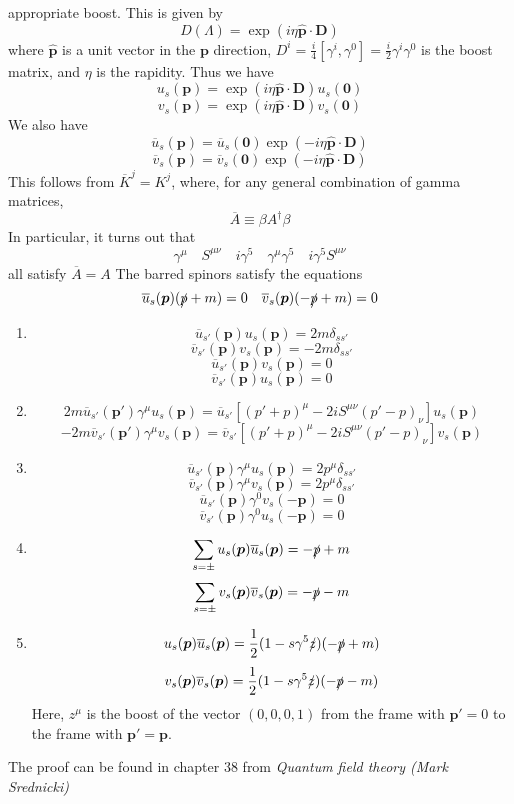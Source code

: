appropriate boost. This is given by
\[D(\Lambda) = \exp(i\eta \hat{\bm{p}} \cdot \bm{D})\]
where $\hat{\bm{p}}$ is a unit vector in the $\bm{p}$ direction, $D^i = \frac{i}{4}[\gamma^i,\gamma^0] = \frac{i}{2} \gamma^i \gamma^0$ is the boost matrix, and $\eta$ is the rapidity. Thus we have
\[u_s(\bm{p}) = \exp(i\eta \hat{\bm{p}} \cdot \bm{D}) u_s(\bm{0})\]
\[v_s(\bm{p}) = \exp(i\eta \hat{\bm{p}} \cdot \bm{D}) v_s(\bm{0})\]
We also have
\[\overline{u}_s(\bm{p}) = \overline{u}_s(\bm{0}) \exp(-i\eta \hat{\bm{p}} \cdot \bm{D}) \]
\[\overline{v}_s(\bm{p}) = \overline{v}_s(\bm{0}) \exp(-i\eta \hat{\bm{p}} \cdot \bm{D}) \]
This follows from $\overline{K}^j = K^j$, where, for any general combination of gamma matrices,
\[\overline{A} \equiv \beta A^{\dagger} \beta\]
In particular, it turns out that
\[\gamma^{\mu} \quad S^{\mu \nu} \quad i\gamma^5  \quad \gamma^{\mu}\gamma^5 \quad i\gamma^5 S^{\mu \nu}\]
all satisfy $\overline{A} = A$
The barred spinors satisfy the equations
\[\overline{u}_s(\bm{p})(\slashed{p}+m)=0 \quad \overline{v}_s(\bm{p})(-\slashed{p}+m)=0\]
\begin{newprop}
\begin{enumerate}
\item \[\overline{u}_{s'}(\bm{p}) u_s(\bm{p}) = 2m\delta_{ss'}\]
\[\overline{v}_{s'}(\bm{p}) v_s(\bm{p}) = -2m\delta_{ss'}\]
\[\overline{u}_{s'}(\bm{p}) v_s(\bm{p}) = 0\]
\[\overline{v}_{s'}(\bm{p}) u_s(\bm{p}) = 0\]
\item 
\[2m \overline{u}_{s'}(\bm{p}') \gamma^{\mu} u_s(\bm{p}) =  \overline{u}_{s'} [(p'+p)^{\mu} -2i S^{\mu \nu}(p'-p)_{\nu}]u_s(\bm{p})\]
\[-2m \overline{v}_{s'}(\bm{p}') \gamma^{\mu} v_s(\bm{p}) =  \overline{v}_{s'} [(p'+p)^{\mu} -2i S^{\mu \nu}(p'-p)_{\nu}]v_s(\bm{p})\]
\item   \[\overline{u}_{s'}(\bm{p}) \gamma^{\mu} u_s(\bm{p}) = 2p^{\mu} \delta_{ss'}\]
\[\overline{v}_{s'}(\bm{p}) \gamma^{\mu} v_s(\bm{p}) = 2p^{\mu} \delta_{ss'}\]
\[\overline{u}_{s'}(\bm{p}) \gamma^{0} v_s(-\bm{p}) = 0\]
\[\overline{v}_{s'}(\bm{p}) \gamma^{0} u_s(-\bm{p}) = 0\]
\item \[\sum_{s=\pm} u_s(\bm{p}) \overline{u}_s(\bm{p}) = - \slashed{p}+m \]
\[\sum_{s=\pm} v_s(\bm{p}) \overline{v}_s(\bm{p}) = - \slashed{p}-m \]
\item \[u_s(\bm{p}) \overline{u}_s(\bm{p}) =\frac{1}{2}(1-s\gamma^5\slashed{z})(-\slashed{p}+m)\]
 \[v_s(\bm{p}) \overline{v}_s(\bm{p}) =\frac{1}{2}(1-s\gamma^5\slashed{z})(-\slashed{p}-m)\]
Here, $z^{\mu}$ is the boost of the vector $(0,0,0,1)$ from the frame with $\bm{p}'=0$ to the frame with $\bm{p}'=\bm{p}$.  
\end{enumerate}
The proof can be found in chapter 38 from \emph{Quantum field theory (Mark Srednicki)}
\end{newprop}
